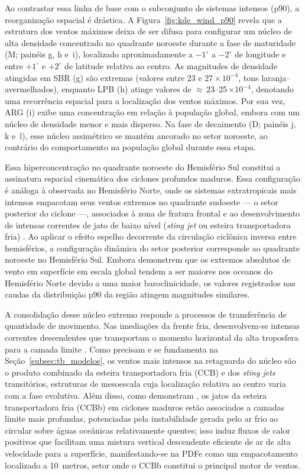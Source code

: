 Ao contrastar essa linha de base com o subconjunto de sistemas intensos (p90), a reorganização espacial é drástica. A Figura~\ref{fig:kde_wind_p90} revela que a estrutura dos ventos máximos deixa de ser difusa para configurar um núcleo de alta densidade concentrado no quadrante noroeste durante a fase de maturidade (M; painéis g, h e~i), localizado aproximadamente a $-1^{\circ}$ a $-2^{\circ}$ de longitude e entre $+1^{\circ}$ e $+2^{\circ}$ de latitude relativa ao centro.
As magnitudes de densidade atingidas em SBR (g) são extremas (valores entre 23 e $27 \times 10^{-4}$, tons laranja--avermelhados), enquanto LPB (h) atinge valores de ${\approx}$\,23--25\,$\times 10^{-4}$, denotando uma recorrência espacial para a localização dos ventos máximos. Por sua vez, ARG (i) exibe uma concentração em relação à população global, embora com um núcleo de densidade menor e mais disperso. Na fase de decaimento (D; painéis j, k e~l), esse núcleo assimétrico se mantém ancorado no setor noroeste, ao contrário do comportamento na população global durante essa etapa.

Essa hiperconcentração no quadrante noroeste do Hemisfério Sul constitui a assinatura espacial cinemática dos ciclones profundos maduros. Essa configuração é análoga à observada no Hemisfério Norte, onde os sistemas extratropicais mais intensos empacotam seus ventos extremos no quadrante sudoeste --- o setor posterior do ciclone ---, associados à zona de fratura frontal e ao desenvolvimento de intensas correntes de jato de baixo nível (\textit{sting jet} ou esteira transportadora fria) \citep{clark2005sting, han2025system}. Ao aplicar o efeito espelho decorrente da circulação ciclônica inversa entre hemisférios, a configuração dinâmica do setor posterior corresponde ao quadrante noroeste no Hemisfério Sul.
Embora \citet{stankovic2025surface} demonstrem que os extremos absolutos de vento em superfície em escala global tendem a ser maiores nos oceanos do Hemisfério Norte devido a uma maior baroclinicidade, os valores registrados nas caudas da distribuição p90 da região atingem magnitudes similares.

A consolidação desse núcleo extremo responde a processos de transferência de quantidade de movimento. Nas imediações da frente fria, desenvolvem-se intensas correntes descendentes que transportam o momento horizontal da alta troposfera para a camada limite \citep{hyeok2024extrem}. Como precisam \citet{martinez2014cold} e se fundamenta na Seção~\ref{subsec:tb_modelos}, os ventos mais intensos na retaguarda do núcleo são o produto combinado da esteira transportadora fria (CCB) e dos \textit{sting jets} transitórios, estruturas de mesoescala cuja localização relativa ao centro varia com a fase evolutiva. Além disso, como demonstram \citet{gentile2023observed}, os jatos da esteira transportadora fria (CCBb) em ciclones maduros estão associados a camadas limite mais profundas, potenciadas pela instabilidade gerada pelo ar frio ao circular sobre águas oceânicas relativamente quentes; isso induz fluxos de calor positivos que facilitam uma mistura vertical descendente eficiente de ar de alta velocidade para a superfície, manifestando-se na PDFe como um empacotamento localizado a 10~metros, setor onde o CCBb constitui o principal motor de ventos.

